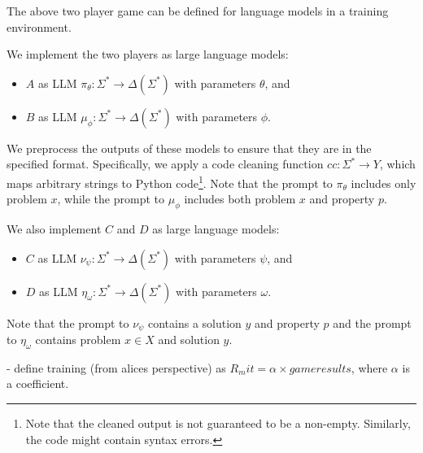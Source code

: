 
The above two player game can be defined for language models in a training environment. 

We implement the two players as large language models:
\begin{itemize}
    \item  $A$ as LLM  $\pi_\theta: \Sigma^* \to \Delta(\Sigma^*)$ with parameters $\theta$, and
    \item $B$ as LLM  $\mu_\phi: \Sigma^* \to \Delta(\Sigma^*)$ with parameters $\phi$.
\end{itemize}
We preprocess the outputs of these models to ensure that they are in the specified format. Specifically, we apply a code cleaning function $cc: \Sigma^* \to Y$, which maps arbitrary strings to Python code\footnote{Note that the cleaned output is not guaranteed to be a non-empty. Similarly, the code might contain syntax errors.}. Note that the prompt to $\pi_\theta$ includes only problem $x$, while the prompt to $\mu_\phi$ includes both problem $x$ and property $p$.

We also implement $C$ and $D$ as large language models:
\begin{itemize}
    \item $C$ as LLM $\nu_\psi: \Sigma^* \to \Delta(\Sigma^*)$ with parameters $\psi$, and
    \item $D$ as LLM $\eta_\omega: \Sigma^* \to \Delta(\Sigma^*)$ with parameters $\omega$.
\end{itemize}
Note that the prompt to $\nu_\psi$ contains a solution $y$ and property $p$ and the prompt to $\eta_\omega$ contains problem $x \in X$ and solution $y$.

- define training (from alices perspective) as $R_mit = \alpha \times game results$, where $\alpha$ is a coefficient. 

